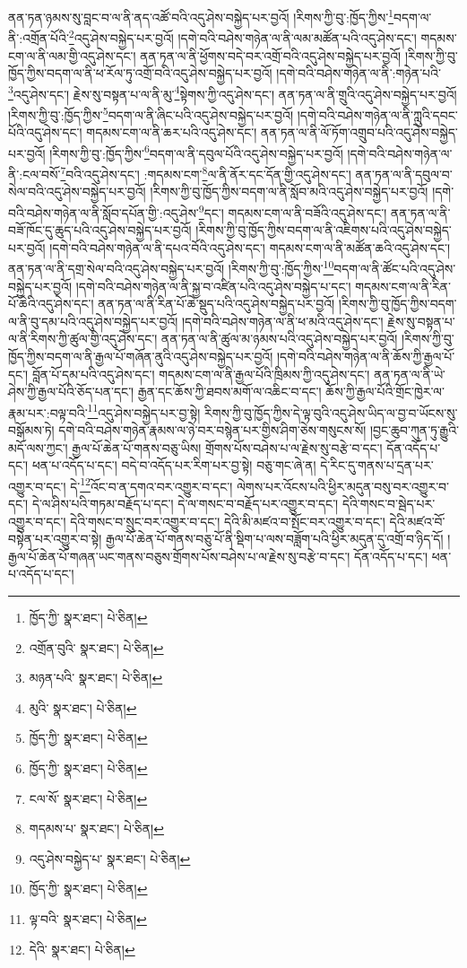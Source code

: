 ནན་ཏན་ཉམས་སུ་བླང་བ་ལ་ནི་ནད་འཚོ་བའི་འདུ་ཤེས་བསྐྱེད་པར་བྱའོ། །རིགས་ཀྱི་བུ་:ཁྱོད་ཀྱིས་\footnote{ཁྱོད་ཀྱི་  སྣར་ཐང་།  པེ་ཅིན། }བདག་ལ་ནི་:འགྲོན་པོའི་\footnote{འགྲོན་བུའི་  སྣར་ཐང་།  པེ་ཅིན། }འདུ་ཤེས་བསྐྱེད་པར་བྱའོ། །དགེ་བའི་བཤེས་གཉེན་ལ་ནི་ལམ་མཚོན་པའི་འདུ་ཤེས་དང་། གདམས་ངག་ལ་ནི་ལམ་གྱི་འདུ་ཤེས་དང་། ནན་ཏན་ལ་ནི་ཕྱོགས་བདེ་བར་འགྲོ་བའི་འདུ་ཤེས་བསྐྱེད་པར་བྱའོ། །རིགས་ཀྱི་བུ་ཁྱོད་ཀྱིས་བདག་ལ་ནི་ཕ་རོལ་ཏུ་འགྲོ་བའི་འདུ་ཤེས་བསྐྱེད་པར་བྱའོ། །དགེ་བའི་བཤེས་གཉེན་ལ་ནི་:གཉེན་པའི་\footnote{མཉན་པའི་  སྣར་ཐང་།  པེ་ཅིན། }འདུ་ཤེས་དང་། རྗེས་སུ་བསྟན་པ་ལ་ནི་མུ་\footnote{མུའི་  སྣར་ཐང་།  པེ་ཅིན། }སྟེགས་ཀྱི་འདུ་ཤེས་དང་། ནན་ཏན་ལ་ནི་གྲུའི་འདུ་ཤེས་བསྐྱེད་པར་བྱའོ། །རིགས་ཀྱི་བུ་:ཁྱོད་ཀྱིས་\footnote{ཁྱོད་ཀྱི་  སྣར་ཐང་།  པེ་ཅིན། }བདག་ལ་ནི་ཞིང་པའི་འདུ་ཤེས་བསྐྱེད་པར་བྱའོ། །དགེ་བའི་བཤེས་གཉེན་ལ་ནི་ཀླུའི་དབང་པོའི་འདུ་ཤེས་དང་། གདམས་ངག་ལ་ནི་ཆར་པའི་འདུ་ཤེས་དང་། ནན་ཏན་ལ་ནི་ལོ་ཏོག་འགྲུབ་པའི་འདུ་ཤེས་བསྐྱེད་པར་བྱའོ། །རིགས་ཀྱི་བུ་:ཁྱོད་ཀྱིས་\footnote{ཁྱོད་ཀྱི་  སྣར་ཐང་།  པེ་ཅིན། }བདག་ལ་ནི་དབུལ་པོའི་འདུ་ཤེས་བསྐྱེད་པར་བྱའོ། །དགེ་བའི་བཤེས་གཉེན་ལ་ནི་:ངལ་བསོ་\footnote{ངལ་སོ་  སྣར་ཐང་།  པེ་ཅིན། }བའི་འདུ་ཤེས་དང་། :གདམས་ངག་\footnote{གདམས་པ་  སྣར་ཐང་།  པེ་ཅིན། }ལ་ནི་ནོར་དང་དོན་གྱི་འདུ་ཤེས་དང་། ནན་ཏན་ལ་ནི་དབུལ་བ་སེལ་བའི་འདུ་ཤེས་བསྐྱེད་པར་བྱའོ། །རིགས་ཀྱི་བུ་ཁྱོད་ཀྱིས་བདག་ལ་ནི་སློབ་མའི་འདུ་ཤེས་བསྐྱེད་པར་བྱའོ། །དགེ་བའི་བཤེས་གཉེན་ལ་ནི་སློབ་དཔོན་གྱི་:འདུ་ཤེས་\footnote{འདུ་ཤེས་བསྐྱེད་པ་  སྣར་ཐང་།  པེ་ཅིན། }དང་། གདམས་ངག་ལ་ནི་བཟོའི་འདུ་ཤེས་དང་། ནན་ཏན་ལ་ནི་བཟོ་ཁོང་དུ་ཆུད་པའི་འདུ་ཤེས་བསྐྱེད་པར་བྱའོ། །རིགས་ཀྱི་བུ་ཁྱོད་ཀྱིས་བདག་ལ་ནི་འཇིགས་པའི་འདུ་ཤེས་བསྐྱེད་པར་བྱའོ། །དགེ་བའི་བཤེས་གཉེན་ལ་ནི་དཔའ་བོའི་འདུ་ཤེས་དང་། གདམས་ངག་ལ་ནི་མཚོན་ཆའི་འདུ་ཤེས་དང་། ནན་ཏན་ལ་ནི་དགྲ་སེལ་བའི་འདུ་ཤེས་བསྐྱེད་པར་བྱའོ། །རིགས་ཀྱི་བུ་:ཁྱོད་ཀྱིས་\footnote{ཁྱོད་ཀྱི་  སྣར་ཐང་།  པེ་ཅིན། }བདག་ལ་ནི་ཚོང་པའི་འདུ་ཤེས་བསྐྱེད་པར་བྱའོ། །དགེ་བའི་བཤེས་གཉེན་ལ་ནི་སྐྱ་བ་འཛིན་པའི་འདུ་ཤེས་བསྐྱེད་པ་དང་། གདམས་ངག་ལ་ནི་རིན་པོ་ཆེའི་འདུ་ཤེས་དང་། ནན་ཏན་ལ་ནི་རིན་པོ་ཆེ་སྡུད་པའི་འདུ་ཤེས་བསྐྱེད་པར་བྱའོ། །རིགས་ཀྱི་བུ་ཁྱོད་ཀྱིས་བདག་ལ་ནི་བུ་དམ་པའི་འདུ་ཤེས་བསྐྱེད་པར་བྱའོ། །དགེ་བའི་བཤེས་གཉེན་ལ་ནི་ཕ་མའི་འདུ་ཤེས་དང་། རྗེས་སུ་བསྟན་པ་ལ་ནི་རིགས་ཀྱི་ཚུལ་གྱི་འདུ་ཤེས་དང་། ནན་ཏན་ལ་ནི་ཚུལ་མ་ཉམས་པའི་འདུ་ཤེས་བསྐྱེད་པར་བྱའོ། །རིགས་ཀྱི་བུ་ཁྱོད་ཀྱིས་བདག་ལ་ནི་རྒྱལ་པོ་གཞོན་ནུའི་འདུ་ཤེས་བསྐྱེད་པར་བྱའོ། །དགེ་བའི་བཤེས་གཉེན་ལ་ནི་ཆོས་ཀྱི་རྒྱལ་པོ་དང་། བློན་པོ་དམ་པའི་འདུ་ཤེས་དང་། གདམས་ངག་ལ་ནི་རྒྱལ་པོའི་ཁྲིམས་ཀྱི་འདུ་ཤེས་དང་། ནན་ཏན་ལ་ནི་ཡེ་ཤེས་ཀྱི་རྒྱལ་པོའི་ཅོད་པན་དང་། རྒྱན་དང་ཆོས་ཀྱི་ཐབས་མགོ་ལ་འཆིང་བ་དང་། ཆོས་ཀྱི་རྒྱལ་པོའི་གྲོང་ཁྱེར་ལ་རྣམ་པར་:བལྟ་བའི་\footnote{ལྟ་བའི་  སྣར་ཐང་།  པེ་ཅིན། }འདུ་ཤེས་བསྐྱེད་པར་བྱ་སྟེ། རིགས་ཀྱི་བུ་ཁྱོད་ཀྱིས་དེ་ལྟ་བུའི་འདུ་ཤེས་ཡིད་ལ་བྱ་བ་ཡོངས་སུ་བསྒོམས་ཏེ། དགེ་བའི་བཤེས་གཉེན་རྣམས་ལ་ཉེ་བར་བསྙེན་པར་གྱིས་ཤིག་ཅེས་གསུངས་སོ། །བྱང་ཆུབ་ཀུན་ཏུ་རྒྱུའི་མདོ་ལས་ཀྱང་། རྒྱལ་པོ་ཆེན་པོ་གནས་བཅུ་ཡིས། གྲོགས་པོས་བཤེས་པ་ལ་རྗེས་སུ་བརྩེ་བ་དང་། དོན་འདོད་པ་དང་། ཕན་པ་འདོད་པ་དང་། བདེ་བ་འདོད་པར་རིག་པར་བྱ་སྟེ། བཅུ་གང་ཞེ་ན། དེ་རིང་དུ་གནས་པ་དྲན་པར་འགྱུར་བ་དང་། དེ་\footnote{དེའི་  སྣར་ཐང་།  པེ་ཅིན། }འོང་བ་ན་དགའ་བར་འགྱུར་བ་དང་། ལེགས་པར་འོངས་པའི་ཕྱིར་མདུན་བསུ་བར་འགྱུར་བ་དང་། དེ་ལ་ཤིས་པའི་གཏམ་བརྗོད་པ་དང་། དེ་ལ་གསང་བ་བརྗོད་པར་འགྱུར་བ་དང་། དེའི་གསང་བ་སྦེད་པར་འགྱུར་བ་དང་། དེའི་གསང་བ་སྲུང་བར་འགྱུར་བ་དང་། དེའི་མི་མཛའ་བ་སྤོང་བར་འགྱུར་བ་དང་། དེའི་མཛའ་བོ་བསྟེན་པར་འགྱུར་བ་སྟེ། རྒྱལ་པོ་ཆེན་པོ་གནས་བཅུ་པོ་ནི་སྡིག་པ་ལས་བཟློག་པའི་ཕྱིར་མདུན་དུ་འགྲོ་བ་ཉིད་དོ། །རྒྱལ་པོ་ཆེན་པོ་གཞན་ཡང་གནས་བཅུས་གྲོགས་པོས་བཤེས་པ་ལ་རྗེས་སུ་བརྩེ་བ་དང་། དོན་འདོད་པ་དང་། ཕན་པ་འདོད་པ་དང་། 